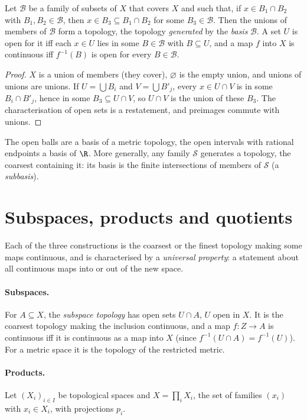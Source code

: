 \begin{proposition}\label{prop:basis}
Let $\mathcal B$ be a family of subsets of $X$ that covers $X$ and such that, if $x\in B_1\cap B_2$ with $B_1,B_2\in\mathcal B$, then $x\in B_3\subseteq B_1\cap B_2$ for some
$B_3\in\mathcal B$. Then the unions of members of $\mathcal B$ form a topology, the topology \emph{generated} by the \emph{basis} $\mathcal B$. A set $U$ is open for it
iff each $x\in U$ lies in some $B\in\mathcal B$ with $B\subseteq U$, and a map $f$ into $X$ is continuous iff $f^{-1}(B)$ is open for every $B\in\mathcal B$.
\end{proposition}
\begin{proof}
$X$ is a union of members (they cover), $\varnothing$ is the empty union, and unions of unions are unions. If $U=\bigcup B_i$ and $V=\bigcup B'_j$, every
$x\in U\cap V$ is in some $B_i\cap B'_j$, hence in some $B_3\subseteq U\cap V$, so $U\cap V$ is the union of these $B_3$. The characterisation of open sets is a
restatement, and preimages commute with unions.
\end{proof}

The open balls are a basis of a metric topology, the open intervals with rational endpoints a basis of $\R$. More
generally, any family $\mathcal S$ generates a topology, the coarsest containing it: its basis is the finite intersections of members
of $\mathcal S$ (a \emph{subbasis}).

\section{Subspaces, products and quotients}

Each of the three constructions is the coarsest or the finest topology making some maps continuous, and is
characterised by a \emph{universal property}: a statement about all continuous maps into or out of the new space.

\paragraph{Subspaces.} For $A\subseteq X$, the \emph{subspace topology} has open sets $U\cap A$, $U$ open in $X$. It is the coarsest topology making
the inclusion continuous, and a map $f:Z\to A$ is continuous iff it is continuous as a map into $X$ (since $f^{-1}(U\cap A)=f^{-1}(U)$). For a metric
space it is the topology of the restricted metric.

\paragraph{Products.} Let $(X_i)_{i\in I}$ be topological spaces and $X=\prod_iX_i$, the set of families $(x_i)$ with $x_i\in X_i$, with projections $p_i$.

